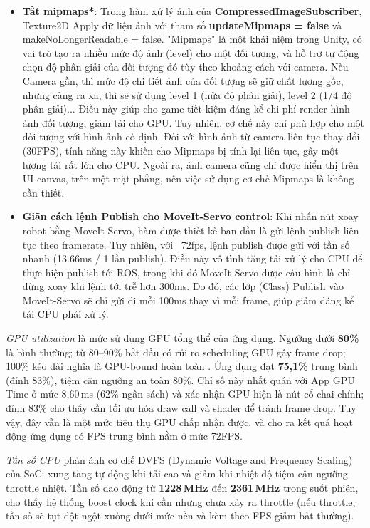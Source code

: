 \begin{itemize}
    \item \textbf{Tắt mipmaps*}: Trong hàm xử lý ảnh của \textbf{CompressedImageSubscriber}, Texture2D Apply dữ liệu ảnh với tham số \textbf{updateMipmaps = false} và makeNoLongerReadable = false. "Mipmaps" là một khái niệm trong Unity, có vai trò tạo ra nhiều mức độ ảnh (level) cho một đối tượng, và hỗ trợ tự động chọn độ phân giải của đối tượng đó tùy theo khoảng cách với camera. Nếu Camera gần, thì mức độ chi tiết ảnh của đối tượng sẽ giữ chất lượng gốc, nhưng càng ra xa, thì sẽ sử dụng level 1 (nửa độ phân giải), level 2 (1/4 độ phân giải)... Điều này giúp cho game tiết kiệm đáng kể chi phí render hình ảnh đối tượng, giảm tải cho GPU. Tuy nhiên, cơ chế này chỉ phù hợp cho một đối tượng với hình ảnh cố định. Đối với hình ảnh từ camera liên tục thay đổi (30FPS), tính năng này khiến cho Mipmaps bị tính lại liên tục, gây một lượng tải rất lớn cho CPU. Ngoài ra, ảnh camera cũng chỉ được hiển thị trên UI canvas, trên một mặt phẳng, nên việc sử dụng cơ chế Mipmaps là không cần thiết. 
    \item \textbf{Giãn cách lệnh Publish cho MoveIt-Servo control}: Khi nhấn nút xoay robot bằng MoveIt-Servo, hàm được thiết kế ban đầu là gửi lệnh publish liên tục theo framerate. Tuy nhiên, với ~72fps, lệnh publish được gửi với tần số nhanh (13.66ms / 1 lần publish). Điều này vô tình tăng tải xử lý cho CPU để thực hiện publish tới ROS, trong khi đó MoveIt-Servo được cấu hình là chỉ dừng xoay khi lệnh tới trễ hơn 300ms. Do đó, các lớp (Class) Publish vào MoveIt-Servo sẽ chỉ gửi đi mỗi 100ms thay vì mỗi frame, giúp giảm đáng kể tải CPU phải xử lý.
\end{itemize}

\textit{GPU utilization} là mức sử dụng GPU tổng thể của ứng dụng. Ngưỡng
dưới \textbf{80\%} là bình thường; từ 80--90\% bắt đầu có rủi ro scheduling GPU gây frame
drop; 100\% kéo dài nghĩa là GPU-bound hoàn toàn \cite{meta_ovr_stats}. Ứng dụng đạt
\textbf{75{,}1\%} trung bình (đỉnh 83\%), tiệm cận ngưỡng an toàn 80\%. Chỉ số này
nhất quán với App GPU Time ở mức 8{,}60\,ms (62\% ngân sách) và xác nhận GPU hiện là
nút cổ chai chính; đỉnh 83\% cho thấy cần tối ưu hóa draw call và shader để tránh frame drop. Tuy vậy, đây vẫn là một mức tiêu thụ GPU chấp nhận được, và cho ra kết quả hoạt động ứng dụng có FPS trung bình nằm ở mức 72FPS.

\textit{Tần số CPU} phản ánh cơ chế DVFS (Dynamic Voltage and Frequency Scaling) của SoC:
xung tăng tự động khi tải cao và giảm khi nhiệt độ tiệm cận ngưỡng throttle nhiệt. Tần số
dao động từ \textbf{1228\,MHz} đến \textbf{2361\,MHz} trong suốt phiên, cho thấy hệ thống
boost clock khi cần nhưng chưa xảy ra throttle (nếu throttle, tần số sẽ tụt đột ngột
xuống dưới mức nền và kèm theo FPS giảm bất thường).

